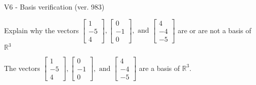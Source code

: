 \begin{exercise}
  \begin{exerciseTitle}V6 - Basis verification (ver. 983)\end{exerciseTitle}
  \begin{exerciseStatement}
    Explain why the vectors \(\left[\begin{array}{r}
1 \\
-5 \\
4
\end{array}\right] , \left[\begin{array}{r}
0 \\
-1 \\
0
\end{array}\right] , \text{ and } \left[\begin{array}{r}
4 \\
-4 \\
-5
\end{array}\right]\) are or are not a basis of \(\mathbb{R}^3\)	


  \end{exerciseStatement}
  \begin{exerciseAnswer}
   The vectors \(\left[\begin{array}{r}
1 \\
-5 \\
4
\end{array}\right] , \left[\begin{array}{r}
0 \\
-1 \\
0
\end{array}\right] , \text{ and } \left[\begin{array}{r}
4 \\
-4 \\
-5
\end{array}\right]\) 
  	 are  a basis of \(\mathbb{R}^3\).
  


  \end{exerciseAnswer}
\end{exercise}